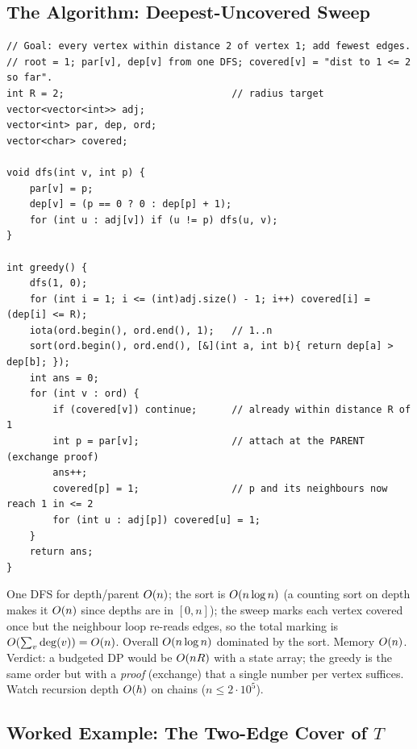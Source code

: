 \subsection{The Algorithm: Deepest-Uncovered Sweep}

\begin{lstlisting}[caption={The CF 1029E greedy: root at 1, sweep vertices by decreasing depth, attach 1 to the parent of each still-uncovered vertex}, label={lst:c27-greedy}]
// Goal: every vertex within distance 2 of vertex 1; add fewest edges.
// root = 1; par[v], dep[v] from one DFS; covered[v] = "dist to 1 <= 2 so far".
int R = 2;                             // radius target
vector<vector<int>> adj;
vector<int> par, dep, ord;
vector<char> covered;

void dfs(int v, int p) {
    par[v] = p;
    dep[v] = (p == 0 ? 0 : dep[p] + 1);
    for (int u : adj[v]) if (u != p) dfs(u, v);
}

int greedy() {
    dfs(1, 0);
    for (int i = 1; i <= (int)adj.size() - 1; i++) covered[i] = (dep[i] <= R);
    iota(ord.begin(), ord.end(), 1);   // 1..n
    sort(ord.begin(), ord.end(), [&](int a, int b){ return dep[a] > dep[b]; });
    int ans = 0;
    for (int v : ord) {
        if (covered[v]) continue;      // already within distance R of 1
        int p = par[v];                // attach at the PARENT (exchange proof)
        ans++;
        covered[p] = 1;                // p and its neighbours now reach 1 in <= 2
        for (int u : adj[p]) covered[u] = 1;
    }
    return ans;
}
\end{lstlisting}

\begin{complexitybox}
One DFS for depth/parent $O(n)$; the sort is $O(n\log n)$ (a counting sort on
depth makes it $O(n)$ since depths are in $[0,n]$); the sweep marks each vertex
covered once but the neighbour loop re-reads edges, so the total marking is
$O(\sum_v \deg(v)) = O(n)$. Overall $O(n \log n)$ dominated by the sort.
Memory $O(n)$. Verdict: a budgeted DP would be $O(nR)$ with a state array;
the greedy is the same order but with a \emph{proof} (exchange) that a single number
per vertex suffices. Watch recursion depth $O(h)$ on chains ($n \le 2\cdot10^5$).
\end{complexitybox}

\subsection{Worked Example: The Two-Edge Cover of $T$}

